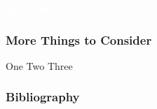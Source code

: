 \documentclass[aspectratio=169]{beamer}
\begin{document}
{
\begin{frame}
\huge{\textcolor{white}{\textbf{0xC: Misc}}}
\end{frame}
}

\begin{frame}
    \frametitle{More Things to Consider}
    One \pause
    Two \pause
    Three
\end{frame}

\begin{frame}
    \frametitle{Bibliography}

\end{frame}



\end{document}
